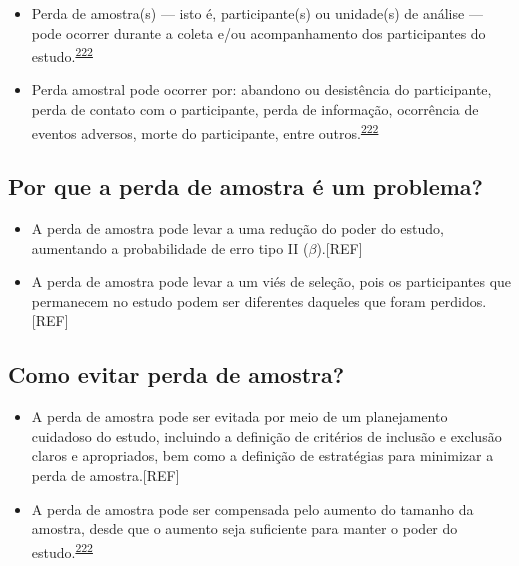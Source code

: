 \documentclass[
  a4paper,
]{book}
\begin{document}
\begin{itemize}
\item
  Perda de amostra(s) --- isto é, participante(s) ou unidade(s) de análise --- pode ocorrer durante a coleta e/ou acompanhamento dos participantes do estudo.\textsuperscript{\protect\hyperlink{ref-rodruxedguezdeluxe1guila2014}{222}}
\item
  Perda amostral pode ocorrer por: abandono ou desistência do participante, perda de contato com o participante, perda de informação, ocorrência de eventos adversos, morte do participante, entre outros.\textsuperscript{\protect\hyperlink{ref-rodruxedguezdeluxe1guila2014}{222}}
\end{itemize}

\hypertarget{por-que-a-perda-de-amostra-uxe9-um-problema}{%
\subsection{Por que a perda de amostra é um problema?}\label{por-que-a-perda-de-amostra-uxe9-um-problema}}

\begin{itemize}
\item
  A perda de amostra pode levar a uma redução do poder do estudo, aumentando a probabilidade de erro tipo II (\(\beta\)).{[}REF{]}
\item
  A perda de amostra pode levar a um viés de seleção, pois os participantes que permanecem no estudo podem ser diferentes daqueles que foram perdidos.{[}REF{]}
\end{itemize}

\hypertarget{como-evitar-perda-de-amostra}{%
\subsection{Como evitar perda de amostra?}\label{como-evitar-perda-de-amostra}}

\begin{itemize}
\item
  A perda de amostra pode ser evitada por meio de um planejamento cuidadoso do estudo, incluindo a definição de critérios de inclusão e exclusão claros e apropriados, bem como a definição de estratégias para minimizar a perda de amostra.{[}REF{]}
\item
  A perda de amostra pode ser compensada pelo aumento do tamanho da amostra, desde que o aumento seja suficiente para manter o poder do estudo.\textsuperscript{\protect\hyperlink{ref-rodruxedguezdeluxe1guila2014}{222}}
\end{itemize}
\end{document}
